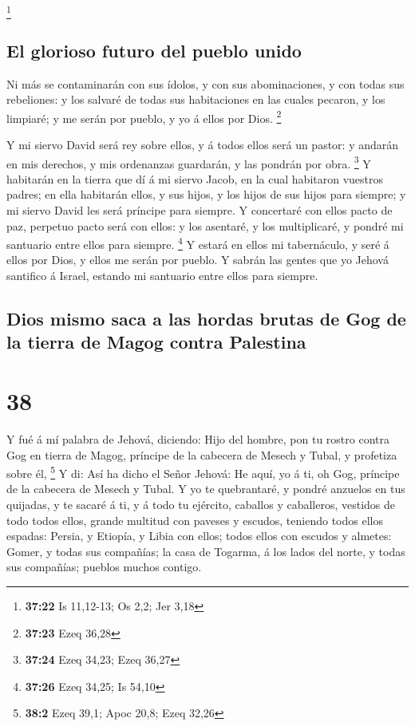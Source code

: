 \footnote{\textbf{37:22} Is 11,12-13; Os 2,2; Jer 3,18}

\hypertarget{el-glorioso-futuro-del-pueblo-unido}{%
\subsection{El glorioso futuro del pueblo
unido}\label{el-glorioso-futuro-del-pueblo-unido}}

 Ni más se contaminarán con sus ídolos, y con sus
abominaciones, y con todas sus rebeliones: y los salvaré de todas sus
habitaciones en las cuales pecaron, y los limpiaré; y me serán por
pueblo, y yo á ellos por Dios. \footnote{\textbf{37:23} Ezeq 36,28}

 Y mi siervo David será rey sobre ellos, y á todos ellos
será un pastor: y andarán en mis derechos, y mis ordenanzas guardarán, y
las pondrán por obra. \footnote{\textbf{37:24} Ezeq 34,23; Ezeq 36,27}
 Y habitarán en la tierra que dí á mi siervo Jacob, en la
cual habitaron vuestros padres; en ella habitarán ellos, y sus hijos, y
los hijos de sus hijos para siempre; y mi siervo David les será príncipe
para siempre.  Y concertaré con ellos pacto de paz,
perpetuo pacto será con ellos: y los asentaré, y los multiplicaré, y
pondré mi santuario entre ellos para siempre. \footnote{\textbf{37:26}
  Ezeq 34,25; Is 54,10}  Y estará en ellos mi tabernáculo,
y seré á ellos por Dios, y ellos me serán por pueblo.  Y
sabrán las gentes que yo Jehová santifico á Israel, estando mi santuario
entre ellos para siempre.

\hypertarget{dios-mismo-saca-a-las-hordas-brutas-de-gog-de-la-tierra-de-magog-contra-palestina}{%
\subsection{Dios mismo saca a las hordas brutas de Gog de la tierra de
Magog contra
Palestina}\label{dios-mismo-saca-a-las-hordas-brutas-de-gog-de-la-tierra-de-magog-contra-palestina}}

\hypertarget{section-37}{%
\section{38}\label{section-37}}

 Y fué á mí palabra de Jehová, diciendo:  Hijo
del hombre, pon tu rostro contra Gog en tierra de Magog, príncipe de la
cabecera de Mesech y Tubal, y profetiza sobre él, \footnote{\textbf{38:2}
  Ezeq 39,1; Apoc 20,8; Ezeq 32,26}  Y di: Así ha dicho el
Señor Jehová: He aquí, yo á ti, oh Gog, príncipe de la cabecera de
Mesech y Tubal.  Y yo te quebrantaré, y pondré anzuelos en
tus quijadas, y te sacaré á ti, y á todo tu ejército, caballos y
caballeros, vestidos de todo todos ellos, grande multitud con paveses y
escudos, teniendo todos ellos espadas:  Persia, y Etiopía, y
Libia con ellos; todos ellos con escudos y almetes:  Gomer,
y todas sus compañías; la casa de Togarma, á los lados del norte, y
todas sus compañías; pueblos muchos contigo.

